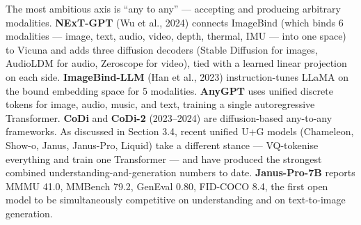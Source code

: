 The most ambitious axis is ``any to any'' --- accepting and producing arbitrary modalities. \textbf{NExT-GPT} (Wu et al., 2024) connects ImageBind (which binds 6 modalities --- image, text, audio, video, depth, thermal, IMU --- into one space) to Vicuna and adds three diffusion decoders (Stable Diffusion for images, AudioLDM for audio, Zeroscope for video), tied with a learned linear projection on each side. \textbf{ImageBind-LLM} (Han et al., 2023) instruction-tunes LLaMA on the bound embedding space for 5 modalities. \textbf{AnyGPT} uses unified discrete tokens for image, audio, music, and text, training a single autoregressive Transformer. \textbf{CoDi} and \textbf{CoDi-2} (2023--2024) are diffusion-based any-to-any frameworks. As discussed in Section 3.4, recent unified U+G models (Chameleon, Show-o, Janus, Janus-Pro, Liquid) take a different stance --- VQ-tokenise everything and train one Transformer --- and have produced the strongest combined understanding-and-generation numbers to date. \textbf{Janus-Pro-7B} reports MMMU 41.0, MMBench 79.2, GenEval 0.80, FID-COCO 8.4, the first open model to be simultaneously competitive on understanding and on text-to-image generation.

